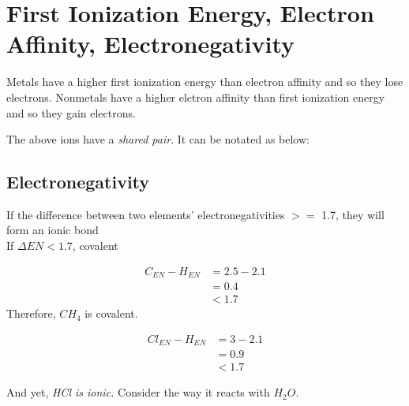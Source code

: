 \documentclass[a4paper, 8pt]{memoir}
\begin{document}
\chapter{First Ionization Energy, Electron Affinity, Electronegativity}
Metals have a higher first ionization energy than electron affinity and so they lose electrons. Nonmetals have a higher elctron affinity than first ionization energy and so they gain electrons.



The above ions have a \emph{shared pair}. It can be notated as below:


\section{Electronegativity}
If the difference between two elements' electronegativities $>=$ 1.7, they will form an ionic bond \\
If $\Delta{}EN < 1.7$, covalent

\begin{align*}
C_{EN}-H_{EN} &= 2.5-2.1 \\
&= 0.4 \\
&< 1.7
\end{align*}
Therefore, $CH_4$ is covalent.

\begin{align*}
Cl_{EN} - H_{EN} &= 3 - 2.1 \\
&= 0.9 \\
&< 1.7
\end{align*}

And yet, \emph{HCl is ionic.} Consider the way it reacts with $H_2O$.
\end{document}

